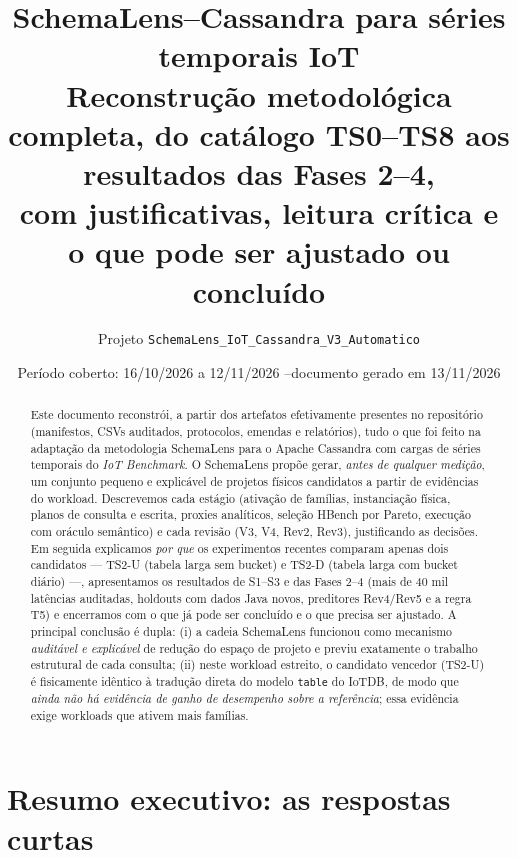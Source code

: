 \documentclass[11pt,a4paper]{article}
\title{\textbf{SchemaLens--Cassandra para séries temporais IoT}\\[4pt]
\large Reconstrução metodológica completa, do catálogo TS0--TS8 aos resultados das Fases 2--4,\\
com justificativas, leitura crítica e o que pode ser ajustado ou concluído}
\author{Projeto \texttt{SchemaLens\_IoT\_Cassandra\_V3\_Automatico}}
\date{Período coberto: 16/10/2026 a 12/11/2026 \quad--\quad documento gerado em 13/11/2026}
\begin{document}
\maketitle

\begin{abstract}
\noindent Este documento reconstrói, a partir dos artefatos efetivamente presentes no repositório (manifestos, CSVs auditados, protocolos, emendas e relatórios), tudo o que foi feito na adaptação da metodologia SchemaLens para o Apache Cassandra com cargas de séries temporais do \emph{IoT Benchmark}. O SchemaLens propõe gerar, \emph{antes de qualquer medição}, um conjunto pequeno e explicável de projetos físicos candidatos a partir de evidências do workload. Descrevemos cada estágio (ativação de famílias, instanciação física, planos de consulta e escrita, proxies analíticos, seleção HBench por Pareto, execução com oráculo semântico) e cada revisão (V3, V4, Rev2, Rev3), justificando as decisões. Em seguida explicamos \emph{por que} os experimentos recentes comparam apenas dois candidatos --- TS2-U (tabela larga sem bucket) e TS2-D (tabela larga com bucket diário) ---, apresentamos os resultados de S1--S3 e das Fases 2--4 (mais de 40 mil latências auditadas, holdouts com dados Java novos, preditores Rev4/Rev5 e a regra T5) e encerramos com o que já pode ser concluído e o que precisa ser ajustado. A principal conclusão é dupla: (i) a cadeia SchemaLens funcionou como mecanismo \emph{auditável e explicável} de redução do espaço de projeto e previu exatamente o trabalho estrutural de cada consulta; (ii) neste workload estreito, o candidato vencedor (TS2-U) é fisicamente idêntico à tradução direta do modelo \texttt{table} do IoTDB, de modo que \emph{ainda não há evidência de ganho de desempenho sobre a referência}; essa evidência exige workloads que ativem mais famílias.
\end{abstract}

\tableofcontents
\newpage

\section{Resumo executivo: as respostas curtas}
\end{document}
